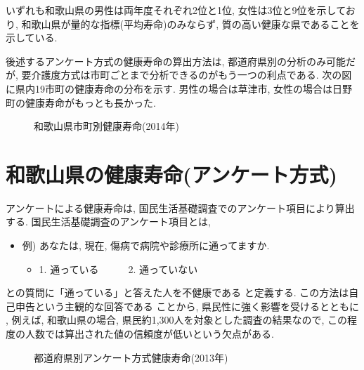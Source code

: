 いずれも和歌山県の男性は両年度それぞれ2位と1位, 女性は3位と9位を示しており, 和歌山県が量的な指標(平均寿命)のみならず, 質の高い健康な県であることを示している.

後述するアンケート方式の健康寿命の算出方法は,
都道府県別の分析のみ可能だが,
要介護度方式は市町ごとまで分析できるのがもう一つの利点である.
次の図に県内19市町の健康寿命の分布を示す. 男性の場合は草津市, 女性の場合は日野町の健康寿命がもっとも長かった.

\begin{figure}[h!]
	\begin{center}
		\caption{和歌山県市町別健康寿命(2014年)}\label{fig1}
	\end{center}
\end{figure}



\section{和歌山県の健康寿命(アンケート方式)}
アンケートによる健康寿命は,
国民生活基礎調査でのアンケート項目により算出する.
国民生活基礎調査のアンケート項目とは,

\begin{itemize} \setlength{\itemsep}{-0.5mm} \setlength{\parskip}{-0.5mm}
	\item  例) あなたは, 現在, 傷病で病院や診療所に通ってますか.
	      \begin{itemize} \setlength{\itemsep}{-0.5mm} \setlength{\parskip}{-0.5mm}
		      \item 1. 通っている~~~~~~2. 通っていない
	      \end{itemize}
\end{itemize}
との質問に「通っている」と答えた人を不健康である
と定義する.
この方法は自己申告という主観的な回答である
ことから, 県民性に強く影響を受けるとともに
, 例えば, 和歌山県の場合, 県民約1,300人を対象とした調査の結果なので, この程度の人数では算出された値の信頼度が低いという欠点がある.

\begin{figure}[h!]
	\begin{center}
		\caption{都道府県別アンケート方式健康寿命(2013年)}\label{fig1}
	\end{center}
\end{figure}

